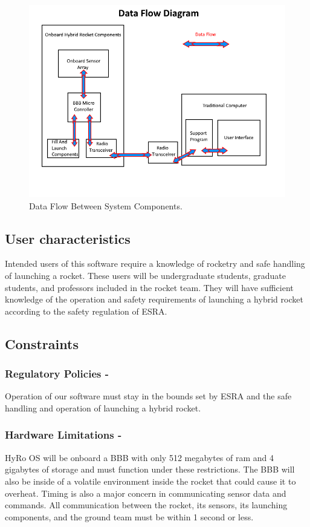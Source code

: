 \documentclass[10pt,draftclsnofoot,onecolumn,compsoc]{IEEEtran}
\begin{document}
\begin{figure}[!ht]
  \caption{Data Flow Between System Components.}
  \centering
	\includegraphics[scale=.85]{RocketBlockDiagram}
\end{figure}
\FloatBarrier
\subsection{ User characteristics}
Intended users of this software require a knowledge of rocketry and safe handling of launching a rocket. These users will be undergraduate students, graduate students, and professors included in the rocket team. They will have sufficient knowledge of the operation and safety requirements of launching a hybrid rocket according to the safety regulation of ESRA.

\subsection{Constraints}

\subsubsection{\bf  Regulatory Policies -} Operation of our software must stay in the bounds set by ESRA and the safe handling and operation of launching a hybrid rocket.  
\subsubsection{\bf  Hardware Limitations -}HyRo OS will be onboard a BBB with only 512 megabytes of ram and 4 gigabytes of storage and must function under these restrictions. The BBB will also be inside of a volatile environment inside the rocket that could cause it to overheat. Timing is also a major concern in communicating sensor data and commands. All communication between the rocket, its sensors, its launching components, and the ground team must be within 1  second or less.
\end{document}
